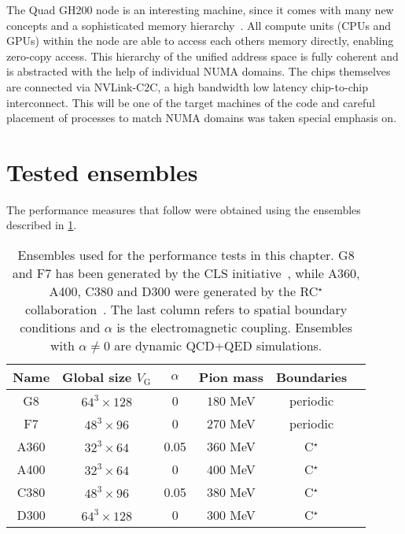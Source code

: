 The Quad GH200 node is an interesting machine, since it comes with many new concepts and a sophisticated memory hierarchy~\cite{fusco2024}.
All compute units (CPUs and GPUs) within the node are able to access each others memory directly, enabling zero-copy access.
This hierarchy of the unified address space is fully coherent and is abstracted with the help of individual NUMA domains.
The chips themselves are connected via NVLink-C2C, a high bandwidth low latency chip-to-chip interconnect.
This will be one of the target machines of the code and careful placement of processes to match NUMA domains was taken special emphasis on.


\section{Tested ensembles}
\label{sec:perf:ensembles}

The performance measures that follow were obtained using the ensembles described in \cref{tab:perf:ensembles}.
\begin{table}[htbp]
\centering
\begin{tabular}{cccccc}
Name & Global size $V_\mathrm{G}$ & $\alpha$ & Pion mass & Boundaries \\
\hline
G8   & $64^3 \times 128$ & \num{0}    & $180$ MeV & periodic  \\
F7   & $48^3 \times 96$  & \num{0}    & $270$ MeV & periodic  \\
A360 & $32^3 \times 64$  & \num{0.05} & $360$ MeV & C$^\star$ \\
A400 & $32^3 \times 64$  & \num{0}    & $400$ MeV & C$^\star$ \\
C380 & $48^3 \times 96$  & \num{0.05} & $380$ MeV & C$^\star$ \\
D300 & $64^3 \times 128$ & \num{0}    & $300$ MeV & C$^\star$
\end{tabular}
\caption{
Ensembles used for the performance tests in this chapter.
G8 and F7 has been generated by the CLS initiative~\cite{online:cls}, while A360, A400, C380 and D300 were generated by the RC$^\star$ collaboration~\cite{RCstar22}.
The last column refers to spatial boundary conditions and $\alpha$ is the electromagnetic coupling.
Ensembles with $\alpha \neq 0$ are dynamic QCD+QED simulations.}
\label{tab:perf:ensembles}
\end{table}

